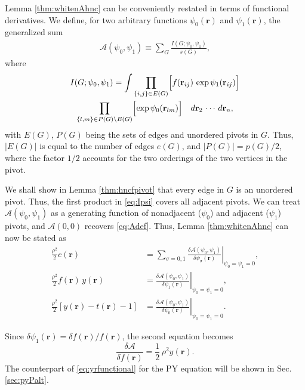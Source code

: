 \documentclass[preprint]{revtex4-1}
\newcommand{\vct}[1]{\mathbf{#1}}
\providecommand{\vr}{} %
\renewcommand{\vr}{\vct{r}}
\newcommand{\A}{\mathcal{A}}
\begin{document}
Lemma \ref{thm:whitenAhnc} can be conveniently
restated in terms of functional derivatives.
%
We define, for two arbitrary functions $\psi_0(\vr)$ and $\psi_1(\vr)$,
the generalized sum
\begin{align}
  \A(\psi_0, \psi_1)
\equiv
  \sum_G \frac{ I(G; \psi_0, \psi_1) } { s(G) },
\label{eq:Apsi}
\end{align}
where
\begin{multline}
  I(G; \psi_0, \psi_1)
=
  \int
    \prod_{\{i, j\} \in E(G)}
    \Bigl[
      f(\vr_{ij}) \, \exp \psi_1(\vr_{ij})
    \Bigr]
  \\
    \prod_{
      \{l, m\} \in P(G) \backslash E(G)
    }
    \Bigl[
      \exp \psi_0(\vr_{lm})
    \Bigr]
  \quad
  d\vr_2 \, \cdots \, d\vr_n,
  \label{eq:Ipsi}
\end{multline}
with $E(G)$, $P(G)$ being the sets of edges and unordered pivots in $G$.
%
Thus, $|E(G)|$ is equal to the number of edges $e(G)$,
and $|P(G)| = p(G)/2$,
where the factor $1/2$ accounts for the two orderings
of the two vertices in the pivot.



We shall show in Lemma \ref{thm:hncfpivot} that
every edge in $G$ is an unordered pivot.
%
Thus,
the first product in \eqref{eq:Ipsi}
covers all adjacent pivots.
%
We can treat
$\A(\psi_0, \psi_1)$
as a generating function
of nonadjacent ($\psi_0$) and adjacent ($\psi_1$) pivots,
%
and $\A(0,0)$ recovers \eqref{eq:Adef}.
%
Thus, Lemma \ref{thm:whitenAhnc} can now be stated as
\begin{align*}
  \frac{\rho^2}{2} c(\vr)
&=
  \left.
  \sum_{\sigma = 0, 1}
  \frac{ \delta \A(\psi_0, \psi_1) } { \delta \psi_\sigma(\vr) }
  \right|_{\psi_0 = \psi_1 = 0},
\\
%
%
%
  \frac{\rho^2}{2} f(\vr) \, y(\vr)
&=
  \left.
  \frac{ \delta \A(\psi_0, \psi_1) } { \delta \psi_1(\vr) }
  \right|_{\psi_0 = \psi_1 = 0},
\\
%
%
%
  \frac{\rho^2}{2}[ y(\vr) - t(\vr) - 1 ]
&=
  \left.
  \frac{ \delta \A(\psi_0, \psi_1) } { \delta \psi_0(\vr) }
  \right|_{\psi_0 = \psi_1 = 0}.
\end{align*}

Since $\delta \psi_1(\vr) = \delta f(\vr)/ f(\vr)$,
the second equation becomes\cite{morita1960I, *hiroike1960II, *morita1961III}
\begin{equation}
  \frac{ \delta \A } { \delta f(\vr) }
  = \frac{1}{2} \, \rho^2 y(\vr).
  \label{eq:yrfunctional}
\end{equation}
The counterpart of \eqref{eq:yrfunctional} for the PY equation
will be shown in Sec. \ref{sec:pyPalt}.
\end{document}
